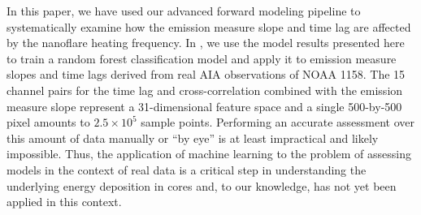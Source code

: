 In this paper, we have used our advanced forward modeling pipeline to systematically examine how the emission measure slope and time lag are affected by the nanoflare heating frequency. In , we use the model results presented here to train a random forest classification model and apply it to emission measure slopes and time lags derived from real AIA observations of NOAA 1158. The 15 channel pairs for the time lag and cross-correlation combined with the emission measure slope represent a 31-dimensional feature space and a single 500-by-500 pixel \AR{} amounts to $2.5\times10^5$ sample points. Performing an accurate assessment over this amount of data manually or ``by eye'' is at least impractical and likely impossible. Thus, the application of machine learning to the problem of assessing models in the context of real data is a critical step in understanding the underlying energy deposition in \AR{} cores and, to our knowledge, has not yet been applied in this context.  
